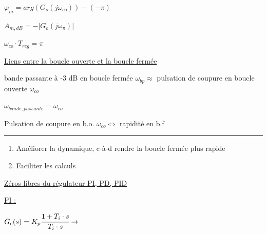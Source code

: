 \documentclass[	DIV=calc,%
							paper=a4,%
							fontsize=11pt,%
							twocolumn]{scrartcl} %
\newcommand{\hformbar}[1]{\bigskip\hrule\vspace{5pt}} %
\newcounter{mycounter}
\newcommand{\formdesc}[1]{\noindent\textbf{#1} \addtocounter{mycounter}{1} \hfill \themycounter}
\newcommand{\formtitle}[1]{\noindent\underline{#1}}
\begin{document}
$\varphi_m = arg(G_o(j\omega_{co}))- (-\pi)$ \quad [rad]

\vspace{3mm}

$A_{m,dB} = -|G_o(j\omega_{\pi})| $\quad  [dB]

\vspace{3mm}
$\omega_{co} \cdot T_{reg} = \pi$

\vspace{3mm}

\formtitle{Liens entre la boucle ouverte et la boucle fermée} 

bande passante à -3 dB en boucle fermée $\omega_{bp} \approx$ pulsation de coupure en boucle ouverte $\omega_{co}$

$\omega_{bande,passante} = \omega_{co}$

Pulsation de coupure en b.o. $\omega_{co} \Leftrightarrow $ rapidité en b.f

\hformbar

\formdesc{Compensation du pôle dominant}

\begin{enumerate}
    \item Améliorer la dynamique, c-à-d rendre la boucle fermée plus rapide
    \item Faciliter les calculs
\end{enumerate}

\formtitle{Zéros libres du régulateur PI, PD, PID} 


\vspace{2mm}

\underline{PI :}

\vspace{2mm}

{\noindent$G_c(s) = K_p \cfrac{1+T_i \cdot s}{T_i \cdot s} \rightarrow$}

\begin{figure}
    \begin{center}
        \vspace{-3.7cm}
    \end{center}
  \end{figure}
\end{document}
